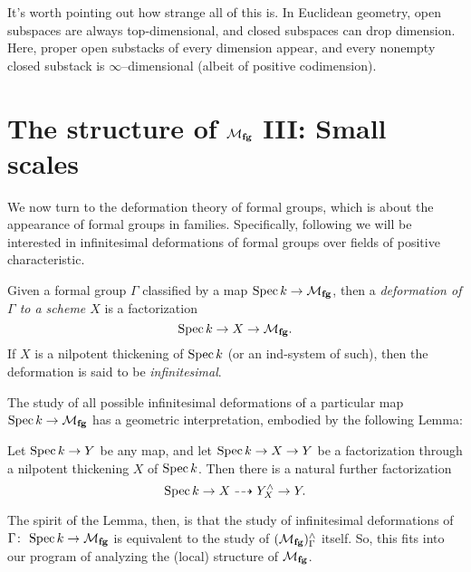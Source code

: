 \begin{remark}
It's worth pointing out how strange all of this is. In Euclidean geometry, open subspaces are always top-dimensional, and closed subspaces can drop dimension.  Here, proper open substacks of every dimension appear, and every nonempty closed substack is $\infty$--dimensional (albeit of positive codimension).
\end{remark}








\section{The structure of $\mathcal{M}_{\mathbf{fg}}$ III: Small scales}


We now turn to the deformation theory of formal groups, which is about the appearance of formal groups in families.  Specifically, following  we will be interested in infinitesimal deformations of formal groups over fields of positive characteristic.

\begin{definition}
Given a formal group $\Gamma$ classified by a map $\operatorname{Spec} k \to \mathcal{M}_{\mathbf{fg}}$, then a \textit{deformation of $\Gamma$ to a scheme $X$} is a factorization \[\operatorname{Spec} k \to X \to \mathcal{M}_{\mathbf{fg}}.\]  If $X$ is a nilpotent thickening of $\operatorname{Spec} k$ (or an ind-system of such), then the deformation is said to be \textit{infinitesimal}.
\end{definition}

The study of all possible infinitesimal deformations of a particular map $\operatorname{Spec} k \to \mathcal{M}_{\mathbf{fg}}$ has a geometric interpretation, embodied by the following Lemma:

\begin{lemma}
Let $\operatorname{Spec} k \to Y$ be any map, and let $\operatorname{Spec} k \to X \to Y$ be a factorization through a nilpotent thickening $X$ of $\operatorname{Spec} k$.  Then there is a natural further factorization \[\Spec k \to X \dashrightarrow Y^\wedge_X \to Y. \qed\]
\end{lemma}

\noindent The spirit of the Lemma, then, is that the study of infinitesimal deformations of $\Gamma\colon\thinspace \operatorname{Spec} k \to \mathcal{M}_{\mathbf{fg}}$ is equivalent to the study of $(\mathcal{M}_{\mathbf{fg}})^\wedge_\Gamma$ itself.  So, this fits into our program of analyzing the (local) structure of $\mathcal{M}_{\mathbf{fg}}$.

